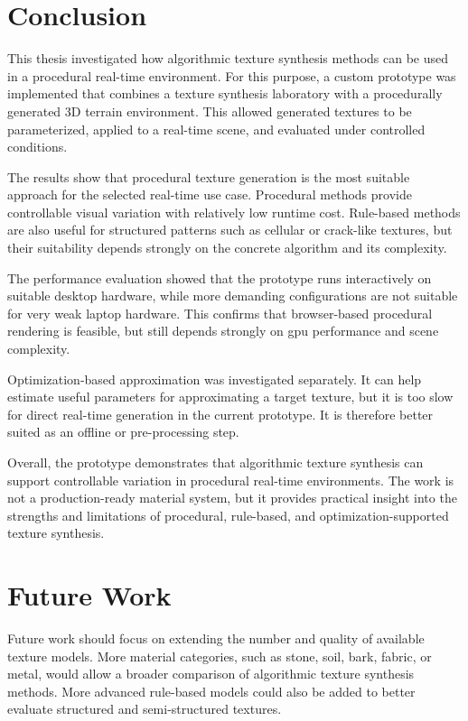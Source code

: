 \section{Conclusion}

This thesis investigated how algorithmic texture synthesis methods can be used in a procedural real-time environment. For this purpose, a custom prototype was implemented that combines a texture synthesis laboratory with a procedurally generated 3D terrain environment. This allowed generated textures to be parameterized, applied to a real-time scene, and evaluated under controlled conditions.

The results show that procedural texture generation is the most suitable approach for the selected real-time use case. Procedural methods provide controllable visual variation with relatively low runtime cost. Rule-based methods are also useful for structured patterns such as cellular or crack-like textures, but their suitability depends strongly on the concrete algorithm and its complexity.

The performance evaluation showed that the prototype runs interactively on suitable desktop hardware, while more demanding configurations are not suitable for very weak laptop hardware. This confirms that browser-based procedural rendering is feasible, but still depends strongly on \gls{gpu} performance and scene complexity.

Optimization-based approximation was investigated separately. It can help estimate useful parameters for approximating a target texture, but it is too slow for direct real-time generation in the current prototype. It is therefore better suited as an offline or pre-processing step.

Overall, the prototype demonstrates that algorithmic texture synthesis can support controllable variation in procedural real-time environments. The work is not a production-ready material system, but it provides practical insight into the strengths and limitations of procedural, rule-based, and optimization-supported texture synthesis.

\section{Future Work}

Future work should focus on extending the number and quality of available texture models. More material categories, such as stone, soil, bark, fabric, or metal, would allow a broader comparison of algorithmic texture synthesis methods. More advanced rule-based models could also be added to better evaluate structured and semi-structured textures.

